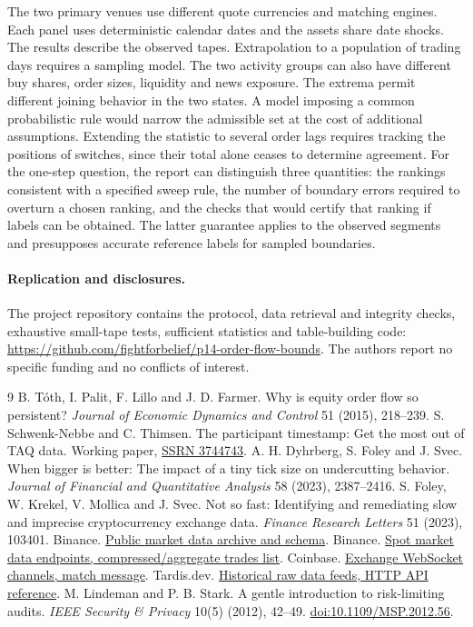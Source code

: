 \documentclass[11pt]{article}
\begin{document}
The two primary venues use different quote currencies and matching engines. Each panel uses deterministic calendar dates and the assets share date shocks. The results describe the observed tapes. Extrapolation to a population of trading days requires a sampling model. The two activity groups can also have different buy shares, order sizes, liquidity and news exposure. The extrema permit different joining behavior in the two states. A model imposing a common probabilistic rule would narrow the admissible set at the cost of additional assumptions. Extending the statistic to several order lags requires tracking the positions of switches, since their total alone ceases to determine agreement. For the one-step question, the report can distinguish three quantities: the rankings consistent with a specified sweep rule, the number of boundary errors required to overturn a chosen ranking, and the checks that would certify that ranking if labels can be obtained. The latter guarantee applies to the observed segments and presupposes accurate reference labels for sampled boundaries.

\paragraph{Replication and disclosures.}
The project repository contains the protocol, data retrieval and integrity checks, exhaustive small-tape tests, sufficient statistics and table-building code:
\url{https://github.com/fightforbelief/p14-order-flow-bounds}. The authors report no specific funding and no conflicts of interest.

\begin{thebibliography}{9}
 B. T\'oth, I. Palit, F. Lillo and J. D. Farmer. Why is equity order flow so persistent? \emph{Journal of Economic Dynamics and Control} 51 (2015), 218--239.
 S. Schwenk-Nebbe and C. Thimsen. The participant timestamp: Get the most out of TAQ data. Working paper, \href{https://ssrn.com/abstract=3744743}{SSRN 3744743}.
 A. H. Dyhrberg, S. Foley and J. Svec. When bigger is better: The impact of a tiny tick size on undercutting behavior. \emph{Journal of Financial and Quantitative Analysis} 58 (2023), 2387--2416.
 S. Foley, W. Krekel, V. Mollica and J. Svec. Not so fast: Identifying and remediating slow and imprecise cryptocurrency exchange data. \emph{Finance Research Letters} 51 (2023), 103401.
 Binance. \href{https://github.com/binance/binance-public-data}{Public market data archive and schema}.
 Binance. \href{https://developers.binance.com/docs/binance-spot-api-docs/rest-api/market-data-endpoints}{Spot market data endpoints, compressed/aggregate trades list}.
 Coinbase. \href{https://docs.cdp.coinbase.com/exchange/websocket-feed/channels}{Exchange WebSocket channels, match message}.
 Tardis.dev. \href{https://docs.tardis.dev/api/http-api-reference}{Historical raw data feeds, HTTP API reference}.
 M. Lindeman and P. B. Stark. A gentle introduction to risk-limiting audits. \emph{IEEE Security \& Privacy} 10(5) (2012), 42--49. \href{https://doi.org/10.1109/MSP.2012.56}{doi:10.1109/MSP.2012.56}.
\end{thebibliography}
\end{document}
